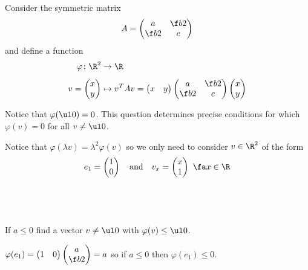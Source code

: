 \documentclass[a4paper]{article}
\begin{document}
\begin{questionbody}
Consider the symmetric matrix \[
A = \begin{pmatrix} a & \f b2 \\ \f b2 & c \end{pmatrix}
\] and define a function \begin{align*}
\varphi \colon \R^2 &\to \R \\[1ex]
v = \begin{pmatrix} x \\ y \end{pmatrix} &\mapsto v^T A v = \begin{pmatrix} x & y \end{pmatrix} \begin{pmatrix} a & \f b2 \\ \f b2 & c \end{pmatrix} \begin{pmatrix} x \\ y \end{pmatrix}
\end{align*}

Notice that $\varphi(\ul 0) = 0$. This question determines precise conditions for which $\varphi(v) = 0$ for all $v \ne \ul 0$.

Notice that $\varphi(\lambda v) = \lambda^2 \varphi(v)$ so we only need to consider $v \in \R^2$ of the form \[
e_1 = \begin{pmatrix} 1 \\ 0 \end{pmatrix} \quad\text{and}\quad
v_x = \begin{pmatrix} x \\ 1 \end{pmatrix}\ \fa x \in \R
\]
\end{questionbody}

\subsection{~} %

\begin{questionbody}
If $a \le 0$ find a vector $v \ne \ul 0$ with $\varphi(v) \le \ul 0$.
\end{questionbody}

$\varphi(e_1) = \begin{pmatrix}1 & 0\end{pmatrix} \begin{pmatrix}a \\ \f b2\end{pmatrix} = a$ so if $a \le 0$ then $\varphi(e_1) \le 0$.
\end{document}
